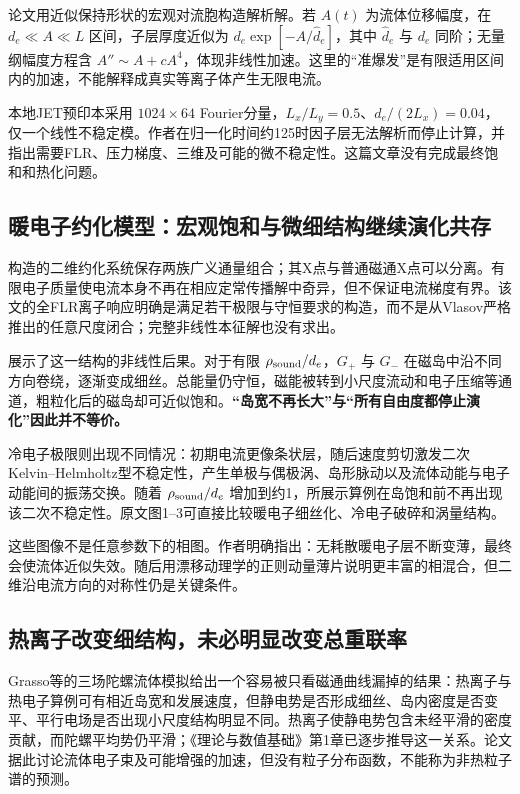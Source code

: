 \documentclass[UTF8,a4paper,11pt,openany,fontset=fandol]{ctexbook}
\begin{document}
论文用近似保持形状的宏观对流胞构造解析解。若 $A(t)$ 为流体位移幅度，在 $d_e\ll A\ll L$ 区间，子层厚度近似为 $d_e\exp[-A/\widehat d_e]$，其中 $\widehat d_e$ 与 $d_e$ 同阶；无量纲幅度方程含 $A''\sim A+cA^4$，体现非线性加速。这里的“准爆发”是有限适用区间内的加速，不能解释成真实等离子体产生无限电流。

本地JET预印本采用 $1024\times64$ Fourier分量，$L_x/L_y=0.5$、$d_e/(2L_x)=0.04$，仅一个线性不稳定模。作者在归一化时间约125时因子层无法解析而停止计算，并指出需要FLR、压力梯度、三维及可能的微不稳定性。这篇文章没有完成最终饱和和热化问题。

\subsection{暖电子约化模型：宏观饱和与微细结构继续演化共存}
\citet{Schep1994}构造的二维约化系统保存两族广义通量组合；其X点与普通磁通X点可以分离。有限电子质量使电流本身不再在相应定常传播解中奇异，但不保证电流梯度有界。该文的全FLR离子响应明确是满足若干极限与守恒要求的构造，而不是从Vlasov严格推出的任意尺度闭合；完整非线性本征解也没有求出。

\citet{L049}展示了这一结构的非线性后果。对于有限 $\rho_{\rm sound}/d_e$，$G_+$ 与 $G_-$ 在磁岛中沿不同方向卷绕，逐渐变成细丝。总能量仍守恒，磁能被转到小尺度流动和电子压缩等通道，粗粒化后的磁岛却可近似饱和。\textbf{“岛宽不再长大”与“所有自由度都停止演化”因此并不等价。}

冷电子极限则出现不同情况：初期电流更像条状层，随后速度剪切激发二次Kelvin--Helmholtz型不稳定性，产生单极与偶极涡、岛形脉动以及流体动能与电子动能间的振荡交换。随着 $\rho_{\rm sound}/d_e$ 增加到约1，所展示算例在岛饱和前不再出现该二次不稳定性。原文图1--3可直接比较暖电子细丝化、冷电子破碎和涡量结构。

这些图像不是任意参数下的相图。作者明确指出：无耗散暖电子层不断变薄，最终会使流体近似失效。随后用漂移动理学的正则动量薄片说明更丰富的相混合，但二维沿电流方向的对称性仍是关键条件。

\subsection{热离子改变细结构，未必明显改变总重联率}
Grasso等的三场陀螺流体模拟给出一个容易被只看磁通曲线漏掉的结果：热离子与热电子算例可有相近岛宽和发展速度，但静电势是否形成细丝、岛内密度是否变平、平行电场是否出现小尺度结构明显不同。热离子使静电势包含未经平滑的密度贡献，而陀螺平均势仍平滑；《理论与数值基础》第1章已逐步推导这一关系。论文据此讨论流体电子束及可能增强的加速，但没有粒子分布函数，不能称为非热粒子谱的预测。\citep{E469}
\end{document}
